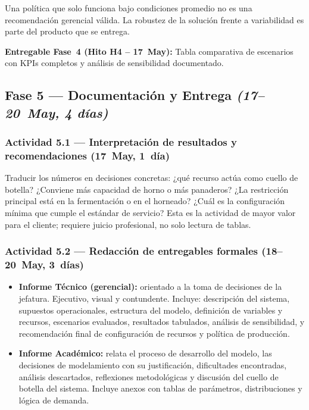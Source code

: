 \documentclass[12pt]{article}
\begin{document}
Una política que solo funciona bajo condiciones promedio no es una recomendación gerencial válida. La robustez de la solución frente a variabilidad es parte del producto que se entrega.

\medskip
\noindent\colorbox{grisclaro}{\parbox{\dimexpr\linewidth-2\fboxsep\relax}{\vspace{2pt}\textbf{Entregable Fase~4 (Hito H4 -- 17~May):} Tabla comparativa de escenarios con KPIs completos y análisis de sensibilidad documentado.\vspace{2pt}}}

\subsection{Fase 5 --- Documentación y Entrega \quad\textit{(17--20~May, 4 días)}}

\subsubsection{Actividad 5.1 --- Interpretación de resultados y recomendaciones \quad(17~May, 1~día)}

Traducir los números en decisiones concretas: ¿qué recurso actúa como cuello de botella? ¿Conviene más capacidad de horno o más panaderos? ¿La restricción principal está en la fermentación o en el horneado? ¿Cuál es la configuración mínima que cumple el estándar de servicio? Esta es la actividad de mayor valor para el cliente; requiere juicio profesional, no solo lectura de tablas.

\subsubsection{Actividad 5.2 --- Redacción de entregables formales \quad(18--20~May, 3~días)}

\begin{itemize}
  \item \textbf{Informe Técnico (gerencial):} orientado a la toma de decisiones de la jefatura. Ejecutivo, visual y contundente. Incluye: descripción del sistema, supuestos operacionales, estructura del modelo, definición de variables y recursos, escenarios evaluados, resultados tabulados, análisis de sensibilidad, y recomendación final de configuración de recursos y política de producción.
  \item \textbf{Informe Académico:} relata el proceso de desarrollo del modelo, las decisiones de modelamiento con su justificación, dificultades encontradas, análisis descartados, reflexiones metodológicas y discusión del cuello de botella del sistema. Incluye anexos con tablas de parámetros, distribuciones y lógica de demanda.
\end{itemize}
\newpage
\end{document}

